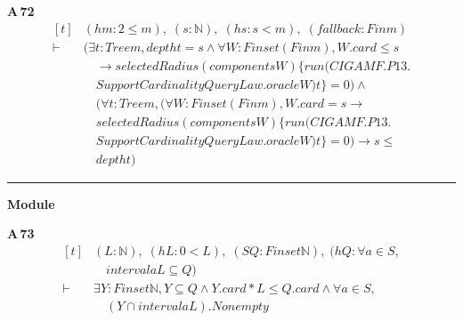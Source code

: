 \noindent\textbf{A\,72}\quad{}
{\footnotesize\[ \begin{aligned}[t]
&(\mathit{hm} : 2 \leq \mathit{m}),\; (\mathit{s} : \mathbb{N} ),\; (\mathit{hs} : \mathit{s} < \mathit{m}),\; (\mathit{fallback} : \mathit{Fin} \mathit{m})\\
\vdash\;&(\exists \mathit{t} : \mathit{Tree} \mathit{m}, \mathit{depth} \mathit{t} = \mathit{s} \wedge \forall \mathit{W} : \mathit{Finset} (\mathit{Fin} \mathit{m}), \mathit{W}.\mathit{card} \leq \mathit{s}\\
&\quad \to \mathit{selectedRadius} (\mathit{components} \mathit{W}) \{ \mathit{run} (\mathit{CIGAMF}.\mathit{P13}.\\
&\quad \mathit{SupportCardinalityQueryLaw}.\mathit{oracle} \mathit{W}) \mathit{t}\} = 0) \wedge\\
&\quad (\forall \mathit{t} : \mathit{Tree} \mathit{m}, (\forall \mathit{W} : \mathit{Finset} (\mathit{Fin} \mathit{m}), \mathit{W}.\mathit{card} = \mathit{s} \to\\
&\quad \mathit{selectedRadius} (\mathit{components} \mathit{W}) \{ \mathit{run} (\mathit{CIGAMF}.\mathit{P13}.\\
&\quad \mathit{SupportCardinalityQueryLaw}.\mathit{oracle} \mathit{W}) \mathit{t}\} = 0) \to \mathit{s} \leq\\
&\quad \mathit{depth} \mathit{t})
\end{aligned} \]}

\vspace{4pt}\noindent\rule{\columnwidth}{0.4pt}\par\vspace{2pt}
\noindent\textbf{Module }\par\vspace{3pt}

\noindent\textbf{A\,73}\quad{}
{\footnotesize\[ \begin{aligned}[t]
&(\mathit{L} : \mathbb{N} ),\; (\mathit{hL} : 0 < \mathit{L}),\; (\mathit{S} \mathit{Q} : \mathit{Finset} \mathbb{N} ),\; (\mathit{hQ} : \forall \mathit{a} \in \mathit{S},\\
&\quad \mathit{interval} \mathit{a} \mathit{L} \subseteq \mathit{Q})\\
\vdash\;&\exists \mathit{Y} : \mathit{Finset} \mathbb{N} ,\mathit{Y} \subseteq \mathit{Q} \wedge \mathit{Y}.\mathit{card}*\mathit{L} \leq \mathit{Q}.\mathit{card} \wedge \forall \mathit{a} \in \mathit{S},\\
&\quad (\mathit{Y} \cap \mathit{interval} \mathit{a} \mathit{L}).\mathit{Nonempty}
\end{aligned} \]}

